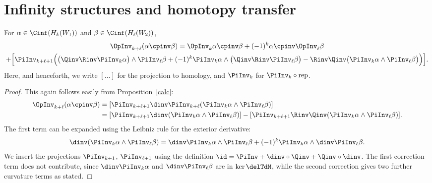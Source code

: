 \section{Infinity structures and homotopy transfer}

\begin{proposition}\label{leib} For $\alpha\in\Cinf(H_k(W_1))$
and $\beta\in\Cinf(H_\ell(W_2))$,
\begin{multline*}
\OpInv_{k+\ell}(\alpha\cpinv \beta)=
\OpInv_k\alpha\cpinv \beta +(-1)^k \alpha\cpinv \OpInv_\ell \beta\\
+\Bigl[\PiInv_{k+\ell+1}\Bigl(\bigl(\Qinv \Rinv \PiInv_k \alpha\bigr)
\wedge \PiInv_\ell \beta +(-1)^k \PiInv_k \alpha \wedge
\bigl(\Qinv \Rinv \PiInv_\ell \beta\bigr)
-\Rinv \Qinv\bigl(\PiInv_k \alpha\wedge\PiInv_\ell \beta\bigr)\Bigr)\Bigr].
\end{multline*}
Here, and henceforth, we write $[\ldots]$ for the projection
to homology, and $\PiInv_k$ for $\PiInv_k\circ\mathrm{rep}$.
\end{proposition}
\begin{proof}
This again follows easily from Proposition~\ref{calc}:
\begin{align*}
\OpInv_{k+\ell}(\alpha\cpinv \beta)
&=[\PiInv_{k+\ell+1}\dinv\PiInv_{k+\ell}
(\PiInv_k\alpha\wedge\PiInv_\ell\beta)]\\
&=[\PiInv_{k+\ell+1}\dinv(\PiInv_k \alpha\wedge\PiInv_\ell \beta)]
-[\PiInv_{k+\ell+1}\Rinv\Qinv(\PiInv_k \alpha\wedge\PiInv_\ell \beta)].
\end{align*}
The first term can be expanded using the Leibniz rule for the exterior
derivative:
\begin{equation*}
\dinv(\PiInv_k \alpha\wedge\PiInv_\ell \beta)=
\dinv\PiInv_k \alpha\wedge\PiInv_\ell \beta
+(-1)^k\PiInv_k \alpha\wedge\dinv\PiInv_\ell \beta.
\end{equation*}
We insert the projections $\PiInv_{k+1}$, $\PiInv_{\ell+1}$ using the
definition $\id=\PiInv+\dinv\circ\Qinv+\Qinv\circ\dinv$. The first
correction term does not contribute, since $\dinv\PiInv_k \alpha$ and
$\dinv\PiInv_\ell \beta$ are in $\ker\delTdM$, while the second correction
gives two further curvature terms as stated.
\end{proof}

